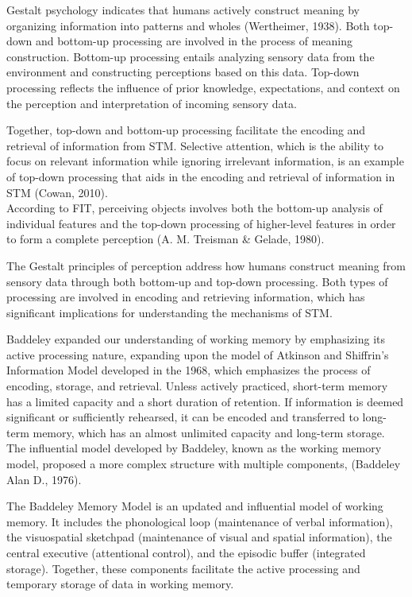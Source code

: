 \documentclass[print]{nuthesis}
\begin{document}
Gestalt psychology indicates that humans actively construct meaning by organizing information into patterns and wholes (Wertheimer, 1938).
Both top-down and bottom-up processing are involved in the process of meaning construction.
Bottom-up processing entails analyzing sensory data from the environment and constructing perceptions based on this data.
Top-down processing reflects the influence of prior knowledge, expectations, and context on the perception and interpretation of incoming sensory data.

Together, top-down and bottom-up processing facilitate the encoding and retrieval of information from STM.
Selective attention, which is the ability to focus on relevant information while ignoring irrelevant information, is an example of top-down processing that aids in the encoding and retrieval of information in STM (Cowan, 2010).\\
According to FIT, perceiving objects involves both the bottom-up analysis of individual features and the top-down processing of higher-level features in order to form a complete perception (A. M. Treisman \& Gelade, 1980).

The Gestalt principles of perception address how humans construct meaning from sensory data through both bottom-up and top-down processing.
Both types of processing are involved in encoding and retrieving information, which has significant implications for understanding the mechanisms of STM.

Baddeley expanded our understanding of working memory by emphasizing its active processing nature, expanding upon the model of Atkinson and Shiffrin's Information Model developed in the 1968, which emphasizes the process of encoding, storage, and retrieval.
Unless actively practiced, short-term memory has a limited capacity and a short duration of retention.
If information is deemed significant or sufficiently rehearsed, it can be encoded and transferred to long-term memory, which has an almost unlimited capacity and long-term storage.
The influential model developed by Baddeley, known as the working memory model, proposed a more complex structure with multiple components, (Baddeley Alan D., 1976).

The Baddeley Memory Model is an updated and influential model of working memory.
It includes the phonological loop (maintenance of verbal information), the visuospatial sketchpad (maintenance of visual and spatial information), the central executive (attentional control), and the episodic buffer (integrated storage).
Together, these components facilitate the active processing and temporary storage of data in working memory.
\end{document}
